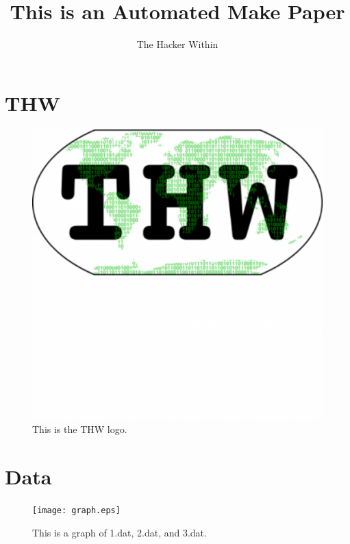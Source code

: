\documentclass[letterpaper]{article}
\author{The Hacker Within}
\date{}
\title{This is an Automated Make Paper}
\begin{document}
\maketitle
\section{THW}
\begin{figure}[htb!]
  \begin{center}
    \includegraphics{thw_icon.eps}
  \end{center}
  \caption{This is the THW logo. }
  \label{fig:thw_logo}
\end{figure}

\section{Data}
\begin{figure}[htb!]
  \begin{center}
    \texttt{[image: graph.eps]}
  \end{center}
  \caption{This is a graph of 1.dat, 2.dat, and 3.dat. }
  \label{fig:graph}
\end{figure}
\end{document}
